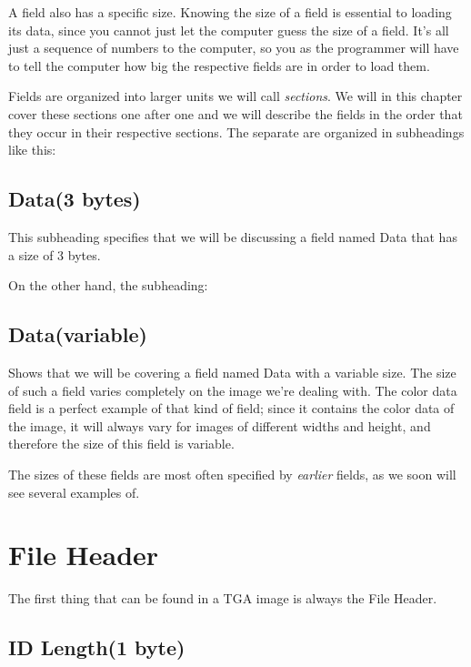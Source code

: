 A field also has a specific size. Knowing the size of a field is
essential to loading its data, since you cannot just let the computer
guess the size of a field. It's all just a sequence of numbers to the
computer, so you as the programmer will have to tell the computer how
big the respective fields are in order to load them.

\newcommand{\plural}[3]{\ifstrequal{#1}{1}{#2}{#3}}
\newcommand{\fieldlength}[1]{\ifstrequal{#1}{0}{variable}{#1 \plural{#1}{byte}{bytes}}}
\newcommand{\imgfield}[2]{\subsection*{#1(\fieldlength{#2})}}
\newcommand{\imgsubfield}[2]{\subsubsection*{#1(\fieldlength{#2})}}

Fields are organized into larger units we will call
\textit{sections}. We will in this chapter cover these
sections one after one and we will describe the fields in the order
that they occur in their respective sections. The separate are
organized in subheadings like this:

\imgfield{Data}{3}

This subheading specifies that we will be discussing a field named
Data that has a size of 3 bytes.

On the other hand, the subheading:

\imgfield{Data}{0}

Shows that we will be covering a field named Data with a variable
size. The size of such a field varies completely on the image we're
dealing with. The color data field is a perfect example of that kind
of field; since it contains the color data of the image, it will
always vary for images of different widths and height, and therefore
the size of this field is variable.

The sizes of these fields are most often specified by \textit{earlier}
fields, as we soon will see several examples of.

\section{File Header}

The first thing that can be found in a TGA image is always the File
Header.

\imgfield{ID Length}{1}


